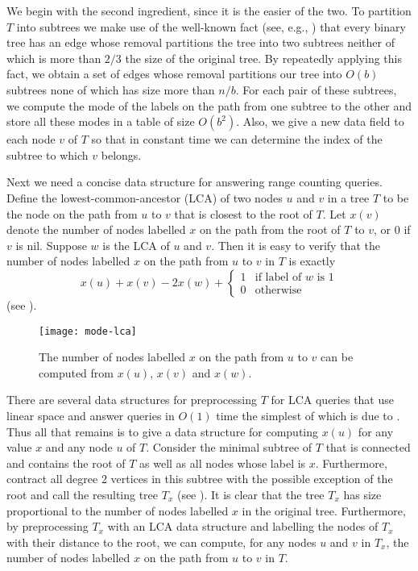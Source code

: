 \documentclass{njcarticle}
\begin{document}
We begin with the second ingredient, since it is the easier of the
two.  To partition $T$ into subtrees we make use of the well-known
fact (see, e.g., \cite{c82}) that every binary tree has an edge
whose removal partitions the tree into two subtrees neither of which
is more than $2/3$ the size of the original tree.  By repeatedly
applying this fact, we obtain a set of edges whose removal partitions
our tree into $O(b)$ subtrees none of which has size more than $n/b$.
For each pair of these subtrees, we compute the mode of the labels on
the path from one subtree to the other and store all these modes in a
table of size $O(b^2)$.  Also, we give a new data field to each node
$v$ of $T$ so that in constant time we can determine the index of the
subtree to which $v$ belongs.

Next we need a concise data structure for answering range counting
queries.  Define the lowest-common-ancestor (LCA) of two nodes $u$ and
$v$ in a tree $T$ to be the node on the path from $u$ to $v$ that is closest
to the root of $T$.   Let $x(v)$ denote the number of nodes labelled
$x$ on the path from the root of $T$ to $v$, or 0 if $v$ is nil.
Suppose $w$ is the LCA of $u$ and $v$.  Then it is easy to verify that
the number of nodes labelled $x$ on the path from $u$ to $v$ in $T$ is
exactly 
\[
x(u)+x(v)-2x(w) + \left\{\begin{array}{ll}
          1 & \mbox{if label of $w$ is 1} \\
	  0 & \mbox{otherwise} \end{array}\right.
\]
(see ).  

\begin{figure}
\begin{center}\texttt{[image: mode-lca]}\end{center}
\caption{The number of nodes labelled $x$ on the path from $u$ to $v$
can be computed from $x(u)$, $x(v)$ and $x(w)$.}
\end{figure}

There are several data structures for preprocessing $T$ for LCA
queries that use linear space and answer queries in $O(1)$ time the
simplest of which is due to \cite{bf00}. Thus
all that remains is to give a data structure for computing $x(u)$ for
any value $x$ and any node $u$ of $T$.  Consider the minimal subtree
of $T$ that is connected and contains the root of $T$ as well as all
nodes whose label is $x$.  Furthermore, contract all degree 2 vertices
in this subtree with the possible exception of the root and call the resulting
tree $T_x$ (see ). It is clear that the tree
$T_x$ has size proportional to the number of nodes labelled $x$ in the
original tree.  Furthermore, by preprocessing $T_x$ with an LCA data
structure and labelling the nodes of $T_x$ with their distance to
the root, we can compute, for any nodes $u$ and $v$ in $T_x$, the number
of nodes labelled $x$ on the path from $u$ to $v$ in $T$.
\end{document}
